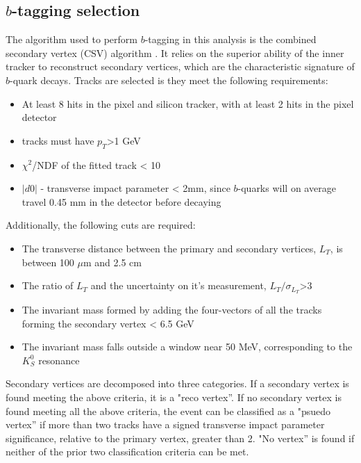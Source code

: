 \subsection{$b$-tagging selection}
\label{btag_overview}

\par The algorithm used to perform $b$-tagging in this analysis is the
combined secondary vertex (CSV) algorithm \cite{Weiser:927399}.  It
relies on the superior ability of the inner tracker to reconstruct
secondary vertices, which are the characteristic signature of
$b$-quark decays.  Tracks are selected is they meet the following
requirements: 
\begin{itemize}
  \item At least 8 hits in the pixel and silicon tracker, with at
    least 2 hits in the pixel detector
  \item tracks must have $p_{T}$>1 GeV
  \item $\chi^{2}$/NDF of the fitted track < 10
  \item $|d0|$ - transverse impact parameter < 2mm, since $b$-quarks
    will on average travel 0.45 mm in the detector before decaying
\end{itemize}

\noindent  Additionally, the following cuts are required:
\begin{itemize}
  \item The transverse distance between the primary and secondary
    vertices, $L_{T}$, is between 100 $\mu$m and 2.5 cm
  \item The ratio of $L_{T}$ and the uncertainty on it's measurement,
    $L_{T}/\sigma_{L_{T}}$>3 
  \item The invariant mass formed by adding the four-vectors of all
    the tracks forming the secondary vertex < 6.5 GeV
  \item The invariant mass falls outside a window near 50 MeV,
    corresponding to the $K_{S}^{0}$ resonance
\end{itemize}

\noindent  Secondary vertices are decomposed into three categories.
If a secondary vertex is found meeting the above criteria, it is a
"reco vertex''.  If no secondary vertex is found meeting all the above
criteria, the event can be classified as a "psuedo vertex'' if more
than two tracks have a signed transverse impact parameter
significance, relative to the primary vertex, greater than 2.  "No
vertex'' is found if neither of the prior two classification criteria
can be met.  
 
